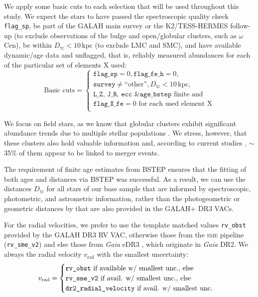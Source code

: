 \documentclass[fleqn,usenatbib]{mnras}
\newcommand{\added}[1]{#1}
\newcommand{\kpc}{\,\mathrm{kpc}}	%
\newcommand{\Gaia}{\textit{Gaia}\xspace} %
\begin{document}
We apply some basic cuts to each selection that will be used throughout this study. We expect the stars to have passed the spectroscopic quality check \texttt{flag\_sp}, be part of the GALAH main survey or the K2/TESS-HERMES follow-up (to exclude observations of the bulge and open/globular clusters, such as $\omega$\,Cen), be within $D_\varpi < 10 \kpc$ (to exclude LMC and SMC), and have available dynamic/age data and unflagged, that is, reliably measured abundances for each of the particular set of elements X used:\begin{equation} \label{eq:basic_cuts}
\text{Basic cuts} = 
\begin{cases}
\texttt{flag\_sp} = 0, \texttt{flag\_fe\_h} = 0, \\
\texttt{survey} \neq \text{``other''}, D_\varpi < 10\kpc, \\
\texttt{L\_Z}\text{, }\texttt{J\_R}\text{, }\texttt{ecc}\text{ \& }\texttt{age\_bstep} \text{ finite and} \\
\texttt{flag\_X\_fe} = 0 \text{ for each used element X} \\
\end{cases}
\end{equation}

We focus on field stars, as we know that globular clusters exhibit significant abundance trends due to multiple stellar populations \citep[e.g.][]{Carretta2009}. We stress, however, that these clusters also hold valuable information and, according to current studies \citep[e.g.][]{Massari2019, KochHansen2021}, $\sim$35\% of them appear to be linked to merger events.

\added{The requirement of finite age estimates from BSTEP \citep[a Bayesian isochrone interpolation tool used as part of GALAH+ DR3][]{Sharma2018} ensures that the fitting of both ages and distances via BSTEP was successful. As a result, we can use the distances $D_\varpi$ for all stars of our base sample that are informed by spectroscopic, photometric, and astrometric information, rather than the photogeometric or geometric distances by \citet{BailerJones2021} that are also provided in the GALAH+ DR3 VACs.}

For the radial velocities, we prefer to use the template matched values \texttt{rv\_obst} provided by the GALAH DR3 RV VAC, otherwise those from the \textsc{sme} pipeline (\texttt{rv\_sme\_v2}) and else those from \Gaia eDR3 \citep{Katz2019}, which originate in \Gaia DR2. We always the radial velocity $v_\text{rad}$ with the smallest uncertainty:
\begin{equation} \label{eq:best_rv}
\centering
v_\text{rad} =
\begin{cases}
\texttt{rv\_obst} \text{ if available w/ smallest unc., else} \\
\texttt{rv\_sme\_v2} \text{ if avail. w/ smallest unc., else} \\
\texttt{dr2\_radial\_velocity} \text{ if avail. w/ smallest unc.}
\end{cases}
\end{equation}
\end{document}
